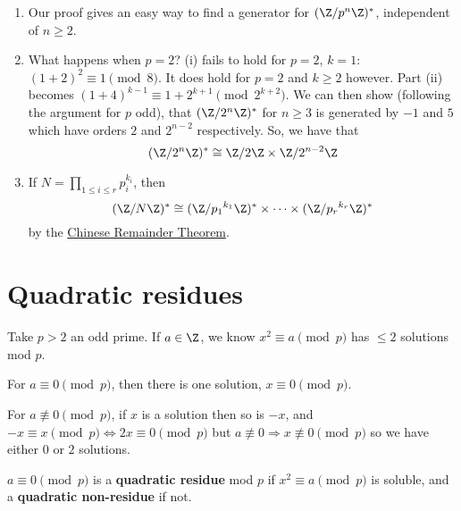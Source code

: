 \documentclass{article}
\begin{document}
\begin{remark}
    \leavevmode
    \begin{enumerate}
        \item Our proof gives an easy way to find a generator for $(\Z / p^n \Z)^*$, independent of $n \geq 2$.
        \item What happens when $p=2$? (i) fails to hold for $p=2$, $k=1$: $(1+2)^2 \equiv 1 \pmod{8}$.  It does hold for $p=2$ and $k \geq 2$ however. Part (ii) becomes $(1+4)^{k-1} \equiv 1 + 2^{k+1} \pmod{2^{k+2}}$.
            We can then show (following the argument for $p$ odd), that $(\Z/2^n \Z)^*$ for $n \geq 3$ is generated by $-1$ and $5$ which have orders $2$ and $2^{n-2}$ respectively.
            So, we have that
            \begin{equation*}
                (\Z/2^n \Z)^* \cong \Z/2\Z \times \Z/2^{n-2} \Z
            \end{equation*}
        \item If $N = \prod_{1 \leq i \leq r} p_i^{k_i}$, then
            \begin{equation*}
                (\Z/N \Z)^* \cong (\Z/{p_1}^{k_1} \Z)^* \times \dotsm \times (\Z/{p_r}^{k_r} \Z)^*
            \end{equation*}
            by the \hyperlink{thm:crt}{Chinese Remainder Theorem}.
    \end{enumerate}
\end{remark}

\clearpage

\section{Quadratic residues}
Take $p > 2$ an odd prime. If $a \in \Z$, we know $x^2 \equiv a \pmod{p}$ has $\leq 2$ solutions mod $p$.

For $a \equiv 0 \pmod{p}$, then there is one solution, $x \equiv 0 \pmod{p}$.

For $a \not \equiv 0 \pmod{p}$, if $x$ is a solution then so is $-x$, and $-x \equiv x \pmod{p} \Leftrightarrow 2x \equiv 0 \pmod{p}$ but $a \not\equiv 0 \Rightarrow x \not\equiv 0 \pmod{p}$ so we have either $0$ or $2$ solutions.

\begin{defi}
    $a \equiv 0 \pmod{p}$ is a \textbf{quadratic residue} mod $p$ if $x^2 \equiv a \pmod{p}$ is soluble, and a \textbf{quadratic non-residue} if not.
\end{defi}
\end{document}
